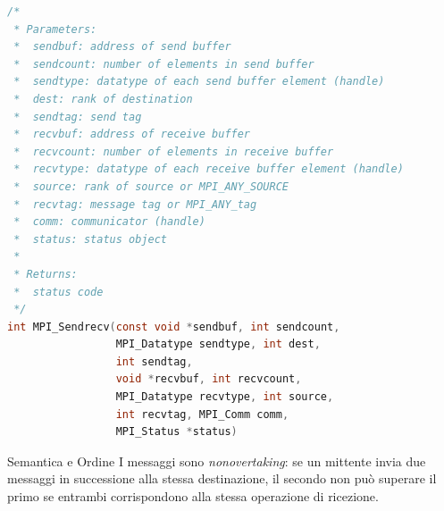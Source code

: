 \begin{lstlisting}[language=C, numbers=none]
/*
 * Parameters:
 *  sendbuf: address of send buffer
 *  sendcount: number of elements in send buffer
 *  sendtype: datatype of each send buffer element (handle)
 *  dest: rank of destination
 *  sendtag: send tag
 *  recvbuf: address of receive buffer
 *  recvcount: number of elements in receive buffer
 *  recvtype: datatype of each receive buffer element (handle)
 *  source: rank of source or MPI_ANY_SOURCE
 *  recvtag: message tag or MPI_ANY_tag
 *  comm: communicator (handle)
 *  status: status object
 * 
 * Returns:
 *  status code
 */
int MPI_Sendrecv(const void *sendbuf, int sendcount,
                 MPI_Datatype sendtype, int dest,
                 int sendtag,
                 void *recvbuf, int recvcount,
                 MPI_Datatype recvtype, int source,
                 int recvtag, MPI_Comm comm,
                 MPI_Status *status)
\end{lstlisting}

\begin{note}{Semantica e Ordine}
    I messaggi sono \emph{nonovertaking}: se un mittente invia due messaggi in successione alla stessa destinazione, il secondo non può superare il primo se entrambi corrispondono alla stessa operazione di ricezione.
\end{note}

